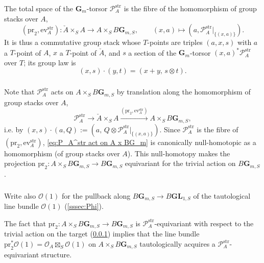 \documentclass[12pt, oneside]{amsart}
\numberwithin{equation}{section}
\theoremstyle{remark}
\theoremstyle{plain}
\newcommand{\OO}{\mathcal{O}}
\newcommand{\GGm}{\mathbf{G}_{m}}
\newcommand{\GGmS}{\mathbf{G}_{m,S}}
\newcommand{\GL}{\mathbf{GL}}
\newcommand{\pr}{\mathrm{pr}}
\newcommand{\ev}{\mathrm{ev}}
\begin{document}
The total space of the $\GGm$-torsor $\mathcal{P}_A^{\mathrm{str}}$ is the fibre of the homomorphism of group stacks over $A$,
\[
  (\pr_2, \ev_A^{\mathrm{str}}) : \check{A} \times_S A \to A \times_S B\GGmS,
  \qquad
  (x,a) \mapsto (a, \mathcal{P}_A^{\mathrm{str}}|_{\{(x,a)\}}).
\]
It is thus a commutative group stack whose $T$-points are triples $(a,x,s)$ with $a$ a $T$-point of $A$, $x$ a $T$-point of $\check{A}$, and $s$ a section of the $\GGm$-torsor $(x,a)^*\mathcal{P}_A^{\mathrm{str}}$ over $T$; its group law is
\[
  (x,s) \cdot (y,t) = (x+y,\, s \otimes t).
\]

\subsubsection{}\label{sssec:P_A^str act on A x BG_m}

Note that $\mathcal{P}_A^{\mathrm{str}}$ acts on $A \times_S B\GGmS$ by translation along the homomorphism of group stacks over $A$,
\begin{equation}\label{eq:P_A^str act on A x BG_m}
  \mathcal{P}_A^{\mathrm{str}} \to \check{A} \times_S A \xrightarrow{(\pr_2, \ev_A^{\mathrm{str}})} A \times_S B\GGmS,
\end{equation}
i.e. by $(x,s) \cdot (a,Q) := (a,\, Q \otimes \mathcal{P}_A^{\mathrm{str}}|_{\{(x,a)\}})$.
Since $\mathcal{P}_A^{\mathrm{str}}$ is the fibre of $(\pr_2, \ev_A^{\mathrm{str}})$, \eqref{eq:P_A^str act on A x BG_m} is canonically null-homotopic as a homomorphism (of group stacks over $A$).
This null-homotopy makes the projection $\pr_2 : A \times_S B\GGmS \to B\GGmS$ equivariant for the trivial action on $B\GGmS$.

\subsubsection{}\label{sssec:O_A boxtimes O(1) equiv}

Write also $\OO(1)$ for the pullback along $B\GGmS \to B\GL_{1,S}$ of the tautological line bundle $\OO(1)$ (\ref{sssec:Phi}).

The fact that $\pr_2 : A \times_S B\GGmS \to B\GGmS$ is $\mathcal{P}_A^{\mathrm{str}}$-equivariant with respect to the trivial action on the target (\ref{sssec:P_A^str act on A x BG_m}) implies that the line bundle $\pr_2^*\OO(1) = \OO_A \boxtimes_S \OO(1)$ on $A \times_S B\GGmS$ tautologically acquires a $\mathcal{P}_A^{\mathrm{str}}$-equivariant structure.

\subsubsection{}
\end{document}
